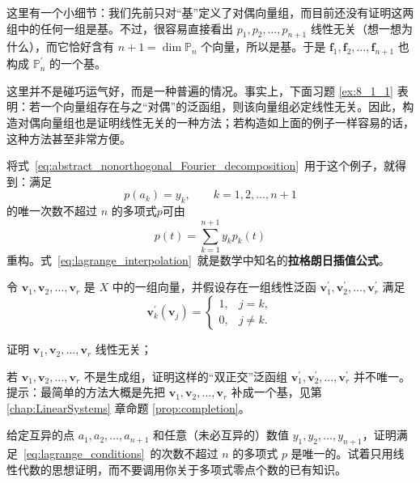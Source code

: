 这里有一个小细节：我们先前只对“基”定义了对偶向量组，而目前还没有证明这两组中的任何一组是基。不过，很容易直接看出
$p_1,p_2,\ldots,p_{n+1}$ 线性无关（想一想为什么），而它恰好含有
$n+1=\dim\mathbb{P}_n$ 个向量，所以是基。于是
$\mathbf{f}_1,\mathbf{f}_2,\ldots,\mathbf{f}_{n+1}$ 也构成 $\mathbb{P}_n^\prime$ 的一个基。

\begin{remark}
    这里并不是碰巧运气好，而是一种普遍的情况。事实上，下面习题 \ref{ex:8_1_1} 表明：若一个向量组存在与之“对偶”的泛函组，则该向量组必定线性无关。因此，构造对偶向量组也是证明线性无关的一种方法；若构造如上面的例子一样容易的话，这种方法甚至非常方便。
\end{remark}

将式~\eqref{eq:abstract_nonorthogonal_Fourier_decomposition}~用于这个例子，就得到：满足
\begin{equation}\label{eq:lagrange_conditions}
    p(a_k)=y_k,\qquad k=1,2,\ldots,n+1
\end{equation}
的唯一次数不超过 $n$ 的多项式$p$可由
\begin{equation}\label{eq:lagrange_interpolation}
    p(t)=\sum_{k=1}^{n+1}y_kp_k(t)
\end{equation}
重构。式~\eqref{eq:lagrange_interpolation}~就是数学中知名的{\bf 拉格朗日插值公式}。

\begin{problemset}
    \item \label{ex:8_1_1}令 $\mathbf{v}_1,\mathbf{v}_2,\ldots,\mathbf{v}_r$ 是 $X$ 中的一组向量，并假设存在一组线性泛函
    $\mathbf{v}_1^\prime,\mathbf{v}_2^\prime,\ldots,\mathbf{v}_r^\prime$ 满足
    \[
        \mathbf{v}_k^\prime(\mathbf{v}_j)
        =
        \begin{cases}
            1,&j=k,\\
            0,&j\ne k.
        \end{cases}
    \]
    \begin{probenumerate}
        \item 证明 $\mathbf{v}_1,\mathbf{v}_2,\ldots,\mathbf{v}_r$ 线性无关；
        \item 若 $\mathbf{v}_1,\mathbf{v}_2,\ldots,\mathbf{v}_r$ 不是生成组，证明这样的“双正交”泛函组 $\mathbf{v}_1^\prime,\mathbf{v}_2^\prime,\ldots,\mathbf{v}_r^\prime$ 并不唯一。提示：最简单的方法大概是先把 $\mathbf{v}_1,\mathbf{v}_2,\ldots,\mathbf{v}_r$ 补成一个基，见第 \ref{chap:LinearSystems} 章命题 \ref{prop:completion}。
    \end{probenumerate}
    \item 给定互异的点 $a_1,a_2,\ldots,a_{n+1}$ 和任意（未必互异的）数值 $y_1,y_2,\ldots,y_{n+1}$，证明满足~\eqref{eq:lagrange_conditions}~的次数不超过 $n$ 的多项式 $p$ 是唯一的。试着只用线性代数的思想证明，而不要调用你关于多项式零点个数的已有知识。
\end{problemset}

